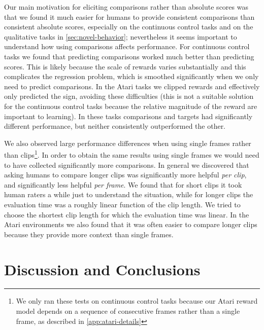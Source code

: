 \documentclass{article}
\begin{document}
Our main motivation for eliciting comparisons rather than absolute scores was that we found it much easier for humans to provide
consistent comparisons than consistent absolute scores, especially on the continuous control tasks and on the qualitative tasks
in \autoref{sec:novel-behavior}; nevertheless it seems important
to understand how using comparisons affects performance.
For continuous control tasks we found that predicting comparisons worked much better than predicting scores.
This is likely because the scale of rewards varies substantially and this complicates the regression problem,
which is smoothed significantly when we only need to predict comparisons.
In the Atari tasks we clipped rewards and effectively only predicted the sign,
avoiding these difficulties (this is not a suitable solution
for the continuous control tasks because the relative magnitude of the reward are important to learning).
In these tasks comparisons and targets had significantly different performance, but neither consistently outperformed the other.

We also observed large performance differences when using single frames rather than clips\footnote{We only ran these tests on continuous control tasks because our Atari reward model depends on a sequence of consecutive frames rather than a single frame,
as described in \autoref{app:atari-details}}.
In order to obtain the same results using single frames we would need to have collected significantly more comparisons. 
In general we discovered that asking humans to compare longer clips was significantly more helpful \emph{per clip},
and significantly less helpful \emph{per frame}.
We found that for short clips it took human raters a while just to understand the situation,
while for longer clips the evaluation time was a roughly linear function of the clip length.
We tried to choose the shortest clip length for which the evaluation time was linear.
In the Atari environments we also found that it was often easier to compare longer clips because they provide more context
than single frames.

\section{Discussion and Conclusions}
\end{document}
